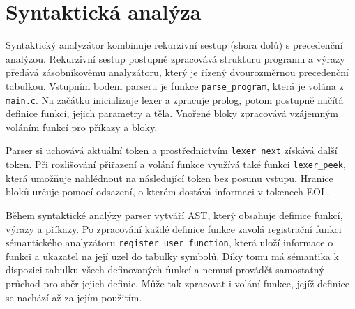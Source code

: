 \documentclass[11pt,a4paper]{article}
\begin{document}
\begin{landscape}
\par
\endgroup
\end{landscape}
\restoregeometry

\section{Syntaktická analýza}
Syntaktický analyzátor kombinuje rekurzivní sestup (shora dolů) s precedenční analýzou. Rekurzivní sestup postupně zpracovává strukturu programu a výrazy předává zásobníkovému analyzátoru, který je řízený dvourozměrnou precedenční tabulkou. Vstupním bodem parseru je funkce \texttt{parse\_program}, která je volána z \texttt{main.c}. Na začátku inicializuje lexer a zpracuje prolog, potom postupně načítá definice funkcí, jejich parametry a těla. Vnořené bloky zpracovává vzájemným voláním funkcí pro příkazy a bloky.

Parser si uchovává aktuální token a prostřednictvím \texttt{lexer\_next} získává další token. Při rozlišování přiřazení a volání funkce využívá také funkci \texttt{lexer\_peek}, která umožňuje nahlédnout na následující token bez posunu vstupu. Hranice bloků určuje pomocí odsazení, o kterém dostává informaci v tokenech EOL.

Během syntaktické analýzy parser vytváří AST, který obsahuje definice funkcí, výrazy a příkazy. Po zpracování každé definice funkce zavolá registrační funkci sémantického analyzátoru \texttt{register\_\allowbreak user\_\allowbreak function}, která uloží informace o funkci a ukazatel na její uzel do tabulky symbolů. Díky tomu má sémantika k dispozici tabulku všech definovaných funkcí a nemusí provádět samostatný průchod pro sběr jejich definic. Může tak zpracovat i volání funkce, jejíž definice se nachází až za jejím použitím.
\end{document}
